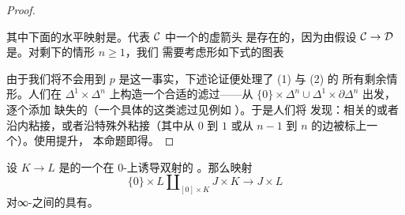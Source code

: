 \begin{proof}
\begin{center}
\end{center}
其中下面的水平映射是\trEquivalence{}。代表 $\mathcal{C}$ 中一个\trEquivalence{}的虚箭头
是存在的，因为由假设 $\mathcal{C} \to \mathcal{D}$ 是\trIsofibration{}。对剩下的情形 $n \ge 1$，我们
需要考虑形如下式的图表
\begin{center}
\end{center}
由于我们将不会用到 $p$ 是\trIsofibration{}这一事实，下述论证便处理了 (1) 与 (2) 的
所有剩余情形。人们在 $\Delta^1 \times \Delta^n$ 上构造一个合适的滤过——从
$\{0\} \times \Delta^n \cup \Delta^1 \times \partial \Delta^n$ 出发，逐个添加
缺失的\trSimplex{}（一个具体的这类滤过见例如 \cite[Lemma 62.2]{Rez20}）。于是人们将
发现：相关的\trSimplex{}或者沿内\trHornInclusion{}粘接，或者沿特殊外\trHorn{}粘接（其中从
$0$ 到 $1$ 或从 $n-1$ 到 $n$ 的边被标上一个\trEquivalence{}）。使用\trJoyal{}提升，
本命题即得。
\end{proof}

\begin{corollary}\label{cor:llp-join-inclusion}
设 $K \to L$ 是\trSimplicialSets{}的一个在 $0$-\trSimplex{}上诱导双射的%
\trMonomorphism{}。那么映射
\[
\{0\} \times L \amalg_{[0] \times K} J \times K \longrightarrow J \times L
\]
对∞-\trCategories{}之间的\trInnerFibration{}具有\trLeftLiftingProperty{}。
\end{corollary}

